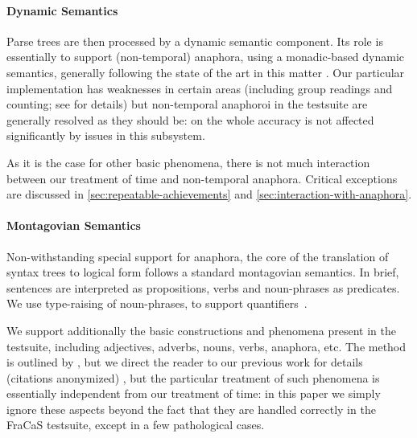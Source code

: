 \documentclass[11pt,a4paper]{article}
\begin{document}
\paragraph{Dynamic Semantics}
Parse trees are then processed by a dynamic semantic component.  Its
role is essentially to support (non-temporal) anaphora, using a
monadic-based dynamic semantics, generally following the state of the
art in this matter
\citep{unger_dynamic_2011,charlow_monadic_2015,charlow_modular_2017}.
Our particular implementation has weaknesses in certain areas (including group readings and counting; see \citet{bernardy_computational_2020} for details)
but non-temporal anaphoroi in the testsuite are generally resolved as
they should be: on the whole accuracy is not affected significantly by
issues in this subsystem.

As it is the case for other basic phenomena, there is not much
interaction between our treatment of time and non-temporal
anaphora. Critical exceptions are discussed in
\cref{sec:repeatable-achievements} and \cref{sec:interaction-with-anaphora}.


\paragraph{Montagovian Semantics}
Non-withstanding special support for anaphora, the core of the translation of syntax trees
to logical form follows a standard
montagovian semantics. In brief, sentences are interpreted as
propositions, verbs and noun-phrases as predicates.  We use
type-raising of noun-phrases, to support
quantifiers~\citep{montague_proper_1974}.

We support additionally the basic constructions and phenomena present
in the testsuite, including adjectives, adverbs, nouns, verbs,
anaphora, etc. The method is outlined by
\citet{montague_english_1970,montague_proper_1973}, but we direct the
reader to our previous work for details \ifanon (citations anonymized)
\else \citet{bernardy_type-theoretical_2017,bernardy_wide-coverage_2019} \fi, but the particular
treatment of such phenomena is essentially independent from our
treatment of time: in this paper we simply ignore these aspects beyond
the fact that they are handled correctly in the
FraCaS testsuite, except in a few pathological cases.
\end{document}

